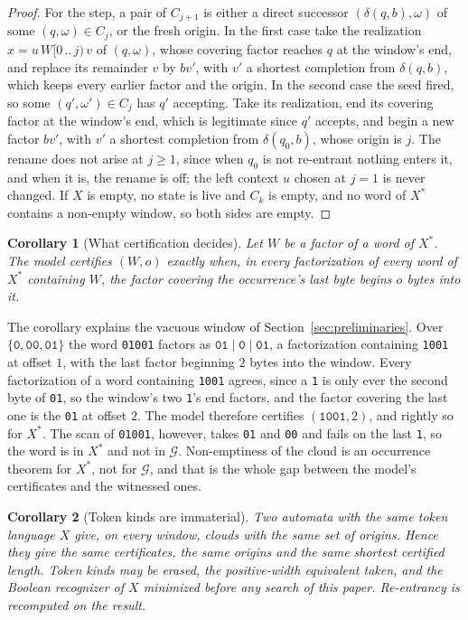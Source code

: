 \documentclass[11pt,a4paper]{article}
\theoremstyle{definition}
\theoremstyle{plain}
\newtheorem{corollary}{Corollary}
\newcommand{\code}[1]{\texttt{#1}}
\begin{document}
\begin{proof}
For the step, a pair of $C_{j+1}$ is either a direct successor $(\delta(q, b), \omega)$ of some $(q, \omega) \in C_j$,
or the fresh origin. In the first case take the realization $x = u\, W[0 \,..\, j)\, v$ of $(q, \omega)$, whose covering
factor reaches $q$ at the window's end, and replace its remainder $v$ by $b v'$, with $v'$ a shortest completion from
$\delta(q, b)$, which keeps every earlier factor and the origin. In the second case the seed fired, so some
$(q', \omega') \in C_j$ has $q'$ accepting. Take its realization, end its covering factor at the window's end, which is
legitimate since $q'$ accepts, and begin a new factor $b v'$, with $v'$ a shortest completion from $\delta(q_0, b)$,
whose origin is $j$. The rename does not arise at $j \geq 1$, since when $q_0$ is not re-entrant nothing enters it, and
when it is, the rename is off; the left context $u$ chosen at $j = 1$ is never changed. If $X$ is empty, no state is
live and $C_k$ is empty, and no word of $X^*$ contains a non-empty window, so both sides are empty.
\end{proof}

\begin{corollary}[What certification decides]
\label{cor:decides}
Let $W$ be a factor of a word of $X^*$. The model certifies $(W, o)$ exactly when, in every factorization of every word
of $X^*$ containing $W$, the factor covering the occurrence's last byte begins $o$ bytes into it.
\end{corollary}

The corollary explains the vacuous window of Section~\ref{sec:preliminaries}. Over $\{\code{0}, \code{00}, \code{01}\}$
the word \code{01001} factors as $\code{01} \mid \code{0} \mid \code{01}$, a factorization containing \code{1001} at
offset $1$, with the last factor beginning $2$ bytes into the window. Every factorization of a word containing
\code{1001} agrees, since a \code{1} is only ever the second byte of \code{01}, so the window's two \code{1}'s end
factors, and the factor covering the last one is the \code{01} at offset $2$. The model therefore certifies
$(\code{1001}, 2)$, and rightly so for $X^*$. The scan of \code{01001}, however, takes \code{01} and \code{00} and fails
on the last \code{1}, so the word is in $X^*$ and not in $\mathcal{G}$. Non-emptiness of the cloud is an occurrence
theorem for $X^*$, not for $\mathcal{G}$, and that is the whole gap between the model's certificates and the witnessed
ones.

\begin{corollary}[Token kinds are immaterial]
\label{cor:kinds}
Two automata with the same token language $X$ give, on every window, clouds with the same set of origins. Hence they
give the same certificates, the same origins and the same shortest certified length. Token kinds may be erased, the
positive-width equivalent taken, and the Boolean recognizer of $X$ minimized before any search of this paper.
Re-entrancy is recomputed on the result.
\end{corollary}
\end{document}
